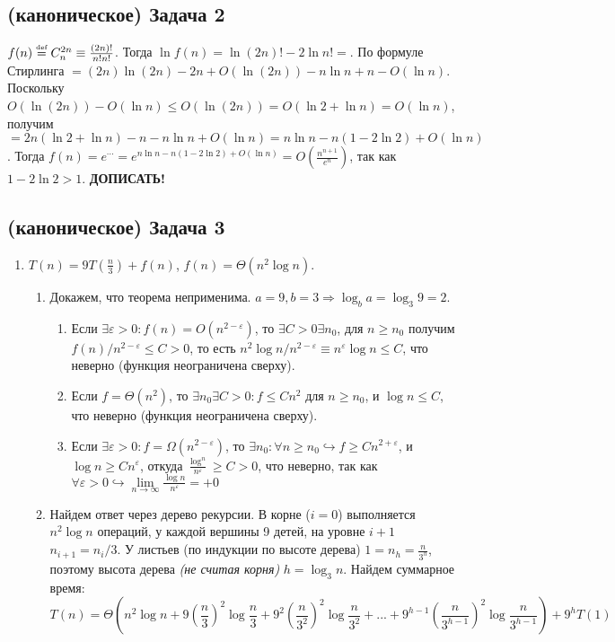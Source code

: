 \documentclass[a4paper]{article}
\def\eps{\varepsilon}
\def\eqdef{\overset{\mbox{\tiny def}}{=}}
\begin{document}
\subsection*{(каноническое) Задача 2}
$f(n)\eqdef C^{2n}_n\equiv\frac{(2n)!}{n!n!}$. Тогда $\ln f(n)=\ln(2n)!-2\ln n!\boxed{=}$. По формуле Стирлинга $\boxed{=}(2n)\ln(2n)-2n+O(\ln(2n))-n\ln n+n-O(\ln n)$. Поскольку $O(\ln(2n))-O(\ln n)\leqslant O(\ln(2n))=O(\ln 2+\ln n)=O(\ln n)$, получим $\boxed{=}2n(\ln 2+\ln n)-n-n\ln n+O(\ln n)=n\ln n-n(1-2\ln 2)+O(\ln n)$. Тогда $f(n)=e^{\cdots}=e^{n\ln n-n(1-2\ln 2)+O(\ln n)}=O(\frac{n^{n+1}}{e^{n}})$, так как $1-2\ln 2>1$.
{\bf ДОПИСАТЬ!}
\subsection*{(каноническое) Задача 3}
\begin{enumerate}
\item $T(n)=9T(\frac{n}{3})+f(n)$, $f(n)=\Theta(n^2\log n)$.
\begin{enumerate}
\item Докажем, что теорема неприменима. $a=9,b=3\Rightarrow \log_b a=\log_3 9=2$.
\begin{enumerate}
\item Если $\exists \eps>0\colon f(n)=O(n^{2-\eps})$, то $\exists C>0\exists n_0$, для $n\geqslant n_0$ получим $f(n)/n^{2-\varepsilon}\leqslant C>0$, то есть $n^2\log n/n^{2-\eps}\equiv n^\varepsilon\log n\leqslant C$, что неверно (функция неограничена сверху).
\item Если $f=\Theta(n^2)$, то $\exists n_0\exists C>0\colon f\leqslant Cn^2$ для $n\geqslant n_0$, и $\log n\leqslant C$, что неверно (функция неограничена сверху).
\item Если $\exists \eps>0\colon f=\Omega(n^{2-\eps})$, то $\exists n_0\colon\forall n\geqslant n_0\hookrightarrow f\geqslant Cn^{2+\eps}$, и $\log n\geqslant Cn^\eps$, откуда $\frac{\log^n}{n^\eps}\geqslant C>0$, что неверно, так как $\forall\eps>0\hookrightarrow\lim\limits_{n\to\infty}\frac{\log n}{n^\eps}=+0$
\end{enumerate}
\item Найдем ответ через дерево рекурсии. В корне ($i=0$) выполняется $n^2\log n$ операций, у каждой вершины 9 детей, на уровне $i+1$ $n_{i+1}=n_i/3$. У листьев (по индукции по высоте дерева) $1=n_h=\frac{n}{3^h}$, поэтому высота дерева {\em (не считая корня)} $h=\log_3n$. Найдем суммарное время:
$$T(n)=\Theta(n^2\log n+9(\frac{n}{3})^2\log\frac{n}{3}+9^2(\frac{n}{3^2})^2\log\frac{n}{3^2}+...+9^{h-1}(\frac{n}{3^{h-1}})^2\log\frac{n}{3^{h-1}})+9^hT(1)$$

\end{enumerate}
\end{enumerate}
\end{document}
